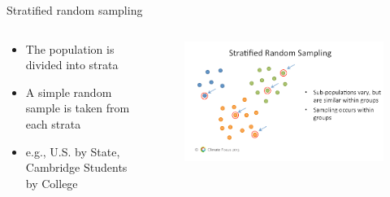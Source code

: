 \documentclass[10pt, compress]{beamer}
\begin{document}
\begin{frame}[t]{Stratified random sampling}
    \begin{columns}
        \begin{block}{}
            \begin{itemize}
                \item The population is divided into strata
                \item A simple random sample is taken from each strata
                \item e.g., U.S. by State, Cambridge Students by College
            \end{itemize}
        \end{block}
        \begin{block}{}
            \begin{figure}
                \begin{center}
                    \includegraphics[scale=0.25]{img/Slide3.png}
                \end{center}
            \end{figure}
        \end{block}
    \end{columns}

\end{frame}
\end{document}
